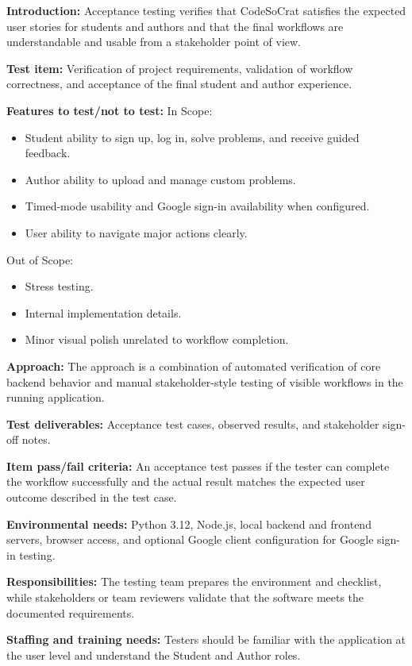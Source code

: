\textbf{Introduction:}
Acceptance testing verifies that CodeSoCrat satisfies the expected user stories for students and authors and that the final workflows are understandable and usable from a stakeholder point of view.

\textbf{Test item:}
Verification of project requirements, validation of workflow correctness, and acceptance of the final student and author experience.

\textbf{Features to test/not to test:}
In Scope:
\begin{itemize}
    \item Student ability to sign up, log in, solve problems, and receive guided feedback.
    \item Author ability to upload and manage custom problems.
    \item Timed-mode usability and Google sign-in availability when configured.
    \item User ability to navigate major actions clearly.
\end{itemize}

Out of Scope:
\begin{itemize}
    \item Stress testing.
    \item Internal implementation details.
    \item Minor visual polish unrelated to workflow completion.
\end{itemize}

\textbf{Approach:}
The approach is a combination of automated verification of core backend behavior and manual stakeholder-style testing of visible workflows in the running application.

\textbf{Test deliverables:}
Acceptance test cases, observed results, and stakeholder sign-off notes.

\textbf{Item pass/fail criteria:}
An acceptance test passes if the tester can complete the workflow successfully and the actual result matches the expected user outcome described in the test case.

\textbf{Environmental needs:}
Python 3.12, Node.js, local backend and frontend servers, browser access, and optional Google client configuration for Google sign-in testing.

\textbf{Responsibilities:}
The testing team prepares the environment and checklist, while stakeholders or team reviewers validate that the software meets the documented requirements.

\textbf{Staffing and training needs:}
Testers should be familiar with the application at the user level and understand the Student and Author roles.

